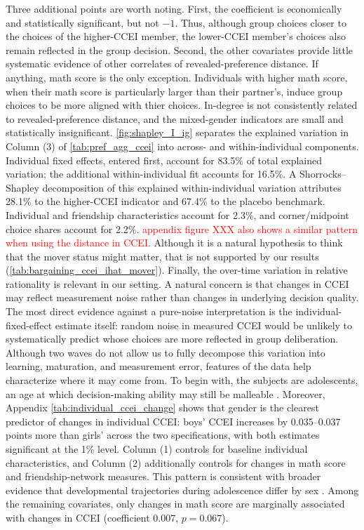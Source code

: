 \documentclass[11 pt]{article}
\begin{document}
Three additional points are worth noting. First, the coefficient is economically and statistically significant, but not $-1$. Thus, although group choices closer to the choices of the higher-CCEI member, the lower-CCEI member's choices also remain reflected in the group decision. Second, the other covariates provide little systematic evidence of other correlates of revealed-preference distance. If anything, math score is the only exception. Individuals with higher math score, when their math score is particularly larger than their partner's, induce group choices to be more aligned with thier choices. In-degree is not consistently related to revealed-preference distance, and the mixed-gender indicators are small and statistically insignificant. \autoref{fig:shapley_I_ig} separates the explained variation in Column (3) of \autoref{tab:pref_agg_ccei} into across- and within-individual components. Individual fixed effects, entered first, account for 83.5\% of total explained variation; the additional within-individual fit accounts for 16.5\%. A Shorrocks--Shapley decomposition of this explained within-individual variation attributes 28.1\% to the higher-CCEI indicator and 67.4\% to the placebo benchmark. Individual and friendship characteristics account for 2.3\%, and corner/midpoint choice shares account for 2.2\%. \textcolor{red}{appendix figure XXX also shows a similar pattern when using the distance in CCEI.} Although it is a natural hypothesis to think that the mover status might matter, that is not supported by our results (\autoref{tab:bargaining_ccei_ihat_mover}).
 Finally, the over-time variation in relative rationality is relevant in our setting. A natural concern is that changes in CCEI may reflect measurement noise rather than changes in underlying decision quality. The most direct evidence against a pure-noise interpretation is the individual-fixed-effect estimate itself: random noise in measured CCEI would be unlikely to systematically predict whose choices are more reflected in group deliberation. Although two waves do not allow us to fully decompose this variation into learning, maturation, and measurement error, features of the data help characterize where it may come from. To begin with, the subjects are adolescents, an age at which decision-making ability may still be malleable \citep{kim2018role}. Moreover, Appendix \autoref{tab:individual_ccei_change} shows that gender is the clearest predictor of changes in individual CCEI: boys' CCEI increases by 0.035--0.037 points more than girls' across the two specifications, with both estimates significant at the 1\% level. Column (1) controls for baseline individual characteristics, and Column (2) additionally controls for changes in math score and friendship-network measures. This pattern is consistent with broader evidence that developmental trajectories during adolescence differ by sex \citep{lenroot2010sex}. Among the remaining covariates, only changes in math score are marginally associated with changes in CCEI (coefficient $0.007$, $p=0.067$).
\end{document}

